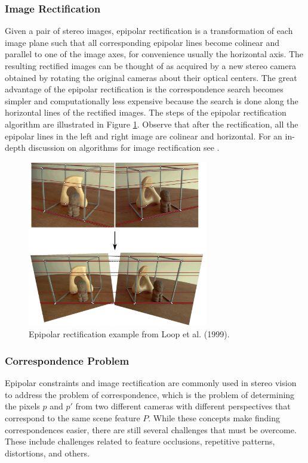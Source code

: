 \subsubsection{Image Rectification}
Given a pair of stereo images, epipolar rectification is a transformation of each image plane such that all corresponding epipolar lines become colinear and parallel to one of the image axes, for convenience usually the horizontal axis. The resulting rectified images can be thought of as acquired by a new stereo camera obtained by rotating the original cameras about their optical centers. The great advantage of the epipolar rectification is the correspondence search becomes simpler and computationally less expensive because the search is done along the horizontal lines of the rectified images. The steps of the epipolar rectification algorithm are illustrated in Figure \ref{fig:rect}. Observe that after the rectification, all the epipolar lines in the left and right image are colinear and horizontal.
For an in-depth discussion on algorithms for image rectification see \cite{Fusiello2000}\cite{LoopZhang1999}.
\begin{figure}[ht]
  \begin{center}
	\includegraphics[width=0.7\textwidth]{tex/figs/ch09_figs/rectification.png}  \end{center}
  \caption{Epipolar rectification example from Loop et al. (1999).}
  \label{fig:rect}
\end{figure}

\subsubsection{Correspondence Problem}
Epipolar constraints and image rectification are commonly used in stereo vision to address the problem of correspondence, which is the problem of determining the pixels $p$ and $p'$ from two different cameras with different perspectives that correspond to the same scene feature $P$. While these concepts make finding correspondences easier, there are still several challenges that must be overcome. These include challenges related to feature occlusions, repetitive patterns, distortions, and others.

